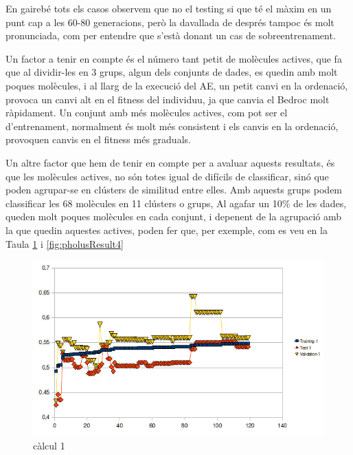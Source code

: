 En gairebé tots els casos observem que no el testing si que té el màxim en un
punt cap a les 60-80 generacions, però la davallada de després tampoc és molt
pronunciada, com per entendre que s'està donant un cas de sobreentrenament.

Un factor a tenir en compte és el número tant petit de molècules actives, que fa
que al dividir-les en 3 grups, algun dels conjunts de dades, es quedin amb molt
poques molècules, i al llarg de la execució del AE, un petit canvi en la
ordenació, provoca un canvi alt en el fitness del individuu, ja que canvia el
Bedroc molt ràpidament.  Un conjunt amb més molècules actives, com pot ser el
d'entrenament, normalment és molt més consistent i els canvis en la ordenació,
provoquen canvis en el fitness més graduals.

Un altre factor que hem de tenir en compte per a avaluar aquests resultats, és
que les molècules actives, no són totes igual de difícils de classificar, sinó
que poden agrupar-se en clústers de similitud entre elles.  Amb aquests grups
podem classificar les 68 molècules en 11 clústers o grups,  Al agafar un 10\% de
les dades, queden molt poques molècules en cada conjunt, i depenent de la
agrupació amb la que quedin aquestes actives, poden fer que, per exemple, com es
veu en la Taula \ref{fig:pholusResult1} i \ref{fig:pholusResult4}

\begin{figure}[h] \begin{center}
\includegraphics[scale=0.75]{pholus/pholus1.png}
\end{center}
\caption{càlcul 1}
\label{fig:pholusResult1}
\end{figure}

